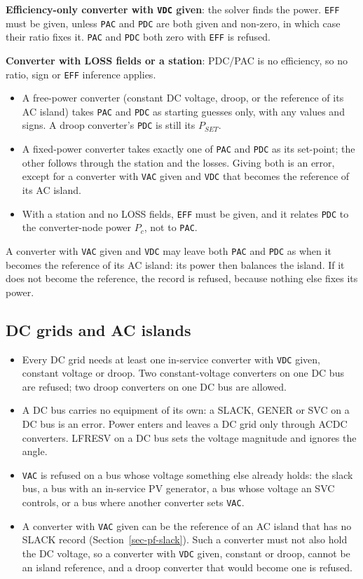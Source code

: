 {\bf Efficiency-only converter with {\tt VDC} given}: the solver finds the power. {\tt EFF} must be given, unless {\tt PAC} and {\tt PDC} are both given and non-zero, in which case their ratio fixes it. {\tt PAC} and {\tt PDC} both zero with {\tt EFF} {\tt *} is refused.

{\bf Converter with LOSS fields or a station}: PDC/PAC is no efficiency, so no ratio, sign or {\tt EFF} inference applies.
\begin{itemize}
\item A free-power converter (constant DC voltage, droop, or the reference of its AC island) takes {\tt PAC} and {\tt PDC} as starting guesses only, with any values and signs. A droop converter's {\tt PDC} is still its $P_{SET}$.
\item A fixed-power converter takes exactly one of {\tt PAC} and {\tt PDC} as its set-point; the other follows through the station and the losses. Giving both is an error, except for a converter with {\tt VAC} given and {\tt VDC} {\tt *} that becomes the reference of its AC island.
\item With a station and no LOSS fields, {\tt EFF} must be given, and it relates {\tt PDC} to the converter-node power $P_c$, not to {\tt PAC}.
\end{itemize}

A converter with {\tt VAC} given and {\tt VDC} {\tt *} may leave both {\tt PAC} and {\tt PDC} as {\tt *} when it becomes the reference of its AC island: its power then balances the island. If it does not become the reference, the record is refused, because nothing else fixes its power.

\subsection{DC grids and AC islands}

\begin{itemize}
\item Every DC grid needs at least one in-service converter with {\tt VDC} given, constant voltage or droop. Two constant-voltage converters on one DC bus are refused; two droop converters on one DC bus are allowed.
\item A DC bus carries no equipment of its own: a SLACK, GENER or SVC on a DC bus is an error. Power enters and leaves a DC grid only through ACDC converters. LFRESV on a DC bus sets the voltage magnitude and ignores the angle.
\item {\tt VAC} is refused on a bus whose voltage something else already holds: the slack bus, a bus with an in-service PV generator, a bus whose voltage an SVC controls, or a bus where another converter sets {\tt VAC}.
\item A converter with {\tt VAC} given can be the reference of an AC island that has no SLACK record (Section~\ref{sec-pf-slack}). Such a converter must not also hold the DC voltage, so a converter with {\tt VDC} given, constant or droop, cannot be an island reference, and a droop converter that would become one is refused.
\end{itemize}

